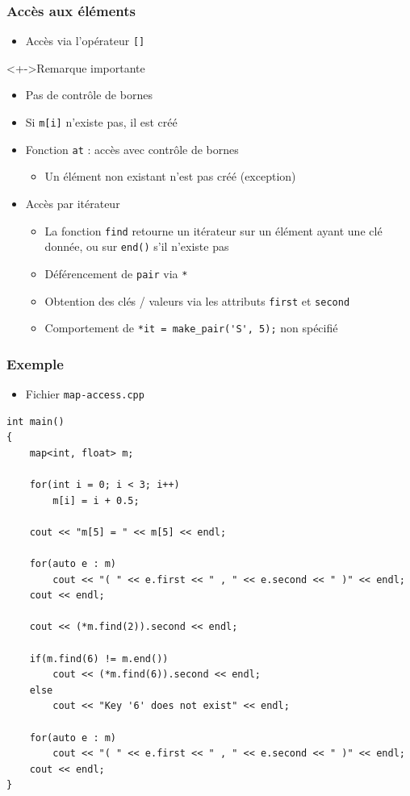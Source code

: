 \begin{frame}
\frametitle{Accès aux éléments}
\begin{itemize}
\item Accès via l'opérateur \texttt{[]}
\end{itemize}
\begin{alertblock}<+->{Remarque importante}
	\begin{itemize}[<+->]
	\item Pas de contrôle de bornes
	\item Si \texttt{m[i]} n'existe pas, il est créé
	\end{itemize}
\end{alertblock}
\begin{itemize}[<+->]
\item Fonction \texttt{at} : accès avec contrôle de bornes
	\begin{itemize}
	\item Un élément non existant n'est pas créé (exception)
	\end{itemize}
\item Accès par itérateur
	\begin{itemize}
	\item La fonction \texttt{find} retourne un itérateur sur un élément ayant une clé donnée, ou sur \texttt{end()} s'il n'existe pas
	\item Déférencement de \texttt{pair} via \texttt{*}
	\item Obtention des clés / valeurs via les attributs \texttt{first} et \texttt{second}
	\item Comportement de \lstinline|*it = make_pair('S', 5);| non spécifié
	\end{itemize}
\end{itemize}
\end{frame}

\begin{frame}[containsverbatim]
\frametitle{Exemple}
\begin{itemize}
\item Fichier \texttt{map-access.cpp}
\end{itemize}
\begin{lstlisting}
int main()
{	
	map<int, float> m;

	for(int i = 0; i < 3; i++)
		m[i] = i + 0.5;

	cout << "m[5] = " << m[5] << endl;

	for(auto e : m)
		cout << "( " << e.first << " , " << e.second << " )" << endl;
	cout << endl;

	cout << (*m.find(2)).second << endl;
	
	if(m.find(6) != m.end())
		cout << (*m.find(6)).second << endl;
	else
		cout << "Key '6' does not exist" << endl;	
	
	for(auto e : m)
		cout << "( " << e.first << " , " << e.second << " )" << endl;
	cout << endl;
}
\end{lstlisting}
\end{frame}

